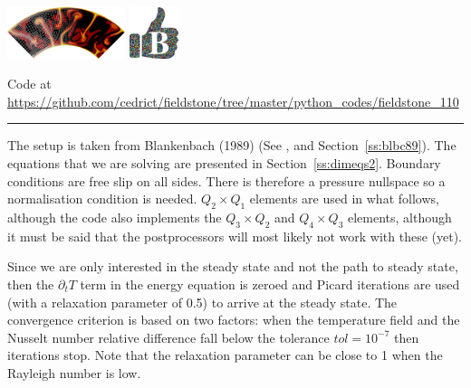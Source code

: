 \includegraphics[height=1.5cm]{images/pictograms/aspect_logo}
\includegraphics[height=1.5cm]{images/pictograms/benchmark}



\begin{center}
Code at \url{https://github.com/cedrict/fieldstone/tree/master/python_codes/fieldstone_110}
\end{center}

\par\noindent\rule{\textwidth}{0.4pt}



The setup is taken from Blankenbach \etal (1989) \cite{blbc89} (See , and Section~\ref{ss:blbc89}). 
The equations that we are solving are presented in Section~\ref{ss:dimeqs2}. 
Boundary conditions are free slip on all sides. There is therefore a pressure nullspace
so a normalisation condition is needed.
$Q_2\times Q_1$ elements are used in what follows, although the code also implements 
the $Q_3\times Q_2$ and $Q_4\times Q_3$ elements, although it must be said that the 
postprocessors will most likely not work with these (yet). 

Since we are only interested in the steady state and not the path to steady state, 
then the $\partial_t T$ term in the energy equation is zeroed and Picard iterations
are used (with a relaxation parameter of 0.5) to arrive at the steady state.
The convergence criterion is based on two factors: when the temperature field and the Nusselt number 
relative difference fall below the tolerance $tol=10^{-7}$ then iterations stop.
Note that the relaxation parameter can be close to 1 when the Rayleigh number is low.

